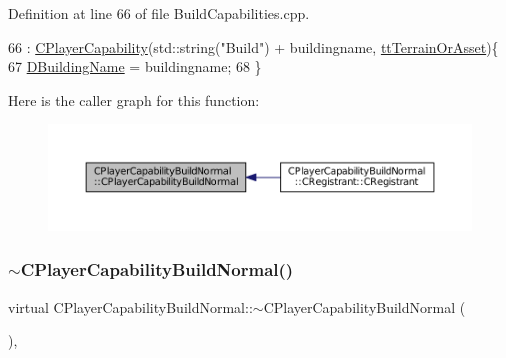 Definition at line 66 of file Build\+Capabilities.\+cpp.


\begin{DoxyCode}
66                                                                                         : 
      \hyperlink{classCPlayerCapability_a303de62aba5d3f65d9a8e013c64a96c1}{CPlayerCapability}(std::string(\textcolor{stringliteral}{"Build"}) + buildingname, 
      \hyperlink{classCPlayerCapability_a9d3450ed1532fd536bd6cbb1e2eef02fa67cc6d11bc0aafc1b786bd6557ba4aa2}{ttTerrainOrAsset})\{
67     \hyperlink{classCPlayerCapabilityBuildNormal_aae09d6cee5f8e201a0139c9065a5577c}{DBuildingName} = buildingname;
68 \}
\end{DoxyCode}
Here is the caller graph for this function\+:
\nopagebreak
\begin{figure}[H]
\begin{center}
\leavevmode
\includegraphics[width=350pt]{classCPlayerCapabilityBuildNormal_a36157bf1a2875f0831b646dd2313a464_icgraph}
\end{center}
\end{figure}
\hypertarget{classCPlayerCapabilityBuildNormal_aed39be621a98ed6d1aaf470cd5bf1ff5}{}\label{classCPlayerCapabilityBuildNormal_aed39be621a98ed6d1aaf470cd5bf1ff5} 
\subsubsection{\texorpdfstring{$\sim$\+C\+Player\+Capability\+Build\+Normal()}{~CPlayerCapabilityBuildNormal()}}
{\footnotesize\ttfamily virtual C\+Player\+Capability\+Build\+Normal\+::$\sim$\+C\+Player\+Capability\+Build\+Normal (\begin{DoxyParamCaption}{ }\end{DoxyParamCaption})\hspace{0.3cm}{\ttfamily [inline]}, {\ttfamily [virtual]}}



